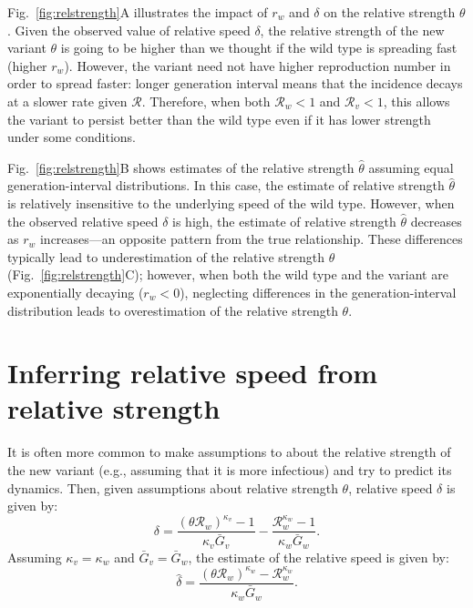 \documentclass[12pt]{article}
\newcommand{\fref}[1]{Fig.~\ref{fig:#1}}
\newcommand{\RR}{\ensuremath{{\mathcal R}}\xspace}
\begin{document}
\fref{relstrength}A illustrates the impact of $r_w$ and $\delta$ on the relative strength $\theta$.
Given the observed value of relative speed $\delta$,
the relative strength of the new variant $\theta$ is going to be higher than we thought if the wild type is spreading fast (higher $r_w$).
However, the variant need not have higher reproduction number in order to spread faster: longer generation interval means that the incidence decays at a slower rate given $\RR$. 
Therefore, when both $\RR_w < 1$ and $\RR_v < 1$, this allows the variant to persist better than the wild type even if it has lower strength under some conditions.

\fref{relstrength}B shows estimates of the relative strength $\hat{\theta}$ assuming equal generation-interval distributions.
In this case, the estimate of relative strength $\hat{\theta}$ is relatively insensitive to the underlying speed of the wild type.
However, when the observed relative speed $\delta$ is high, the estimate of relative strength $\hat{\theta}$ decreases as $r_w$ increases---an opposite pattern from the true relationship.
These differences typically lead to underestimation of the relative strength $\theta$ (\fref{relstrength}C);
however, when both the wild type and the variant are exponentially decaying ($r_w < 0$), neglecting differences in the generation-interval distribution leads to overestimation of the relative strength $\theta$.

\section{Inferring relative speed from relative strength}

It is often more common to make assumptions to about the relative strength of the new variant (e.g., assuming that it is more infectious) and try to predict its dynamics.
Then, given assumptions about relative strength $\theta$, relative speed $\delta$ is given by:
\begin{equation}
\delta = \frac{(\theta \RR_w)^{\kappa_v} - 1}{\kappa_v \bar{G}_v} - \frac{\RR_w^{\kappa_w} - 1}{\kappa_w \bar{G}_w}.
\end{equation}
Assuming $\kappa_v = \kappa_w$ and $\bar{G}_v = \bar{G}_w$, the estimate of the relative speed is given by:
\begin{equation}
\hat{\delta} = \frac{(\theta \RR_w)^{\kappa_w} - \RR_w^{\kappa_w}}{\kappa_w \bar{G}_w}.
\end{equation}
\end{document}
